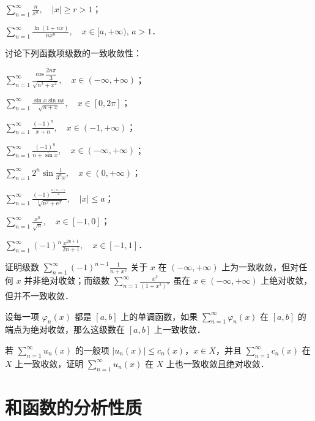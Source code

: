 \begin{xiti}
\begin{ziti}
\item $\displaystyle\sum_{n=1}^{\infty}\frac{n}{x^{n}},\quad\left|x\right|\geqslant r>1$；
\item $\displaystyle\sum_{n=1}^{\infty}\frac{\ln(1+nx)}{nx^{n}},\quad x\in[a,+\infty),\,a>1$．
\end{ziti}
\item 讨论下列函数项级数的一致收敛性：
\begin{ziti}
\item $\displaystyle\sum_{n=1}^{\infty}\frac{\cos\dfrac{2n\pi}{3}}{\sqrt{n^{2}+x^{2}}},\quad x\in(-\infty,+\infty)$；
\item $\displaystyle\sum_{n=1}^{\infty}\frac{\sin x\sin nx}{\sqrt{n+x}},\quad x\in[0,2\pi]$；
\item $\displaystyle\sum_{n=1}^{\infty}\frac{(-1)^{n}}{x+n},\quad x\in(-1,+\infty)$；
\item $\displaystyle\sum_{n=1}^{\infty}\frac{(-1)^{n}}{n+\sin x},\quad x\in(-\infty,+\infty)$；
\item $\displaystyle\sum_{n=1}^{\infty}2^{n}\sin\frac{1}{3^{n}x},\quad x\in(0,+\infty)$；
\item $\displaystyle\sum_{n=1}^{\infty}\frac{(-1)^{\frac{n(n-1)}{2}}}{\sqrt[3]{n^{2}+\mathrm{e}^{x}}},\quad\left|x\right|\leqslant a$；
\item $\displaystyle\sum_{n=1}^{\infty}\frac{x^{n}}{\sqrt{n}},\quad x\in[-1,0]$；
\item $\displaystyle\sum_{n=1}^{\infty}(-1)^{n}\frac{x^{2n+1}}{2n+1},\quad x\in[-1,1]$．
\end{ziti}
\item 证明级数 $\displaystyle\sum_{n=1}^{\infty}(-1)^{n-1}\frac{1}{n+x^{2}}$ 关于 $x$ 在 $(-\infty,+\infty)$ 上为一致收敛，但对任何 $x$ 并非绝对收敛；而级数 $\displaystyle\sum_{n=1}^{\infty}\frac{x^{2}}{\left(1+x^{2}\right)^{n}}$ 虽在 $x\in(-\infty,+\infty)$ 上绝对收敛，但并不一致收敛．
\item 设每一项 $\varphi_{n}(x)$ 都是 $[a,b]$ 上的单调函数，如果 $\displaystyle\sum_{n=1}^{\infty}\varphi_{n}(x)$ 在 $[a,b]$ 的端点为绝对收敛，那么这级数在 $[a,b]$ 上一致收敛．
\item 若 $\displaystyle\sum_{n=1}^{\infty}u_{n}(x)$ 的一般项 $\left|u_{n}(x)\right|\leqslant c_{n}(x)$，$x\in X$，并且 $\displaystyle\sum_{n=1}^{\infty}c_{n}(x)$ 在 $X$ 上一致收敛，证明 $\displaystyle\sum_{n=1}^{\infty}u_{n}(x)$ 在 $X$ 上也一致收敛且绝对收敛．
\end{xiti}

\section{和函数的分析性质}

